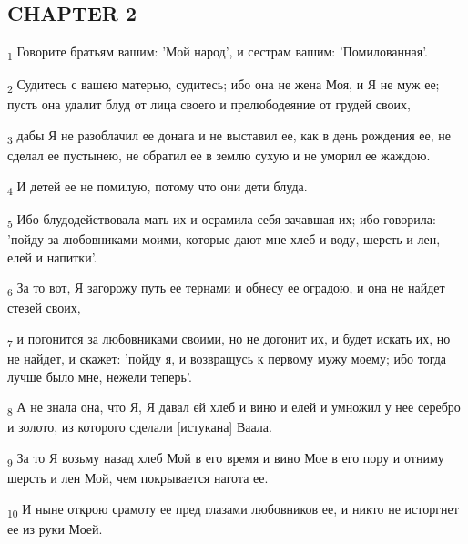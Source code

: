 \subsection{CHAPTER 2}
\begin{tcolorbox}
\textsubscript{1} Говорите братьям вашим: 'Мой народ', и сестрам вашим: 'Помилованная'.
\end{tcolorbox}
\begin{tcolorbox}
\textsubscript{2} Судитесь с вашею матерью, судитесь; ибо она не жена Моя, и Я не муж ее; пусть она удалит блуд от лица своего и прелюбодеяние от грудей своих,
\end{tcolorbox}
\begin{tcolorbox}
\textsubscript{3} дабы Я не разоблачил ее донага и не выставил ее, как в день рождения ее, не сделал ее пустынею, не обратил ее в землю сухую и не уморил ее жаждою.
\end{tcolorbox}
\begin{tcolorbox}
\textsubscript{4} И детей ее не помилую, потому что они дети блуда.
\end{tcolorbox}
\begin{tcolorbox}
\textsubscript{5} Ибо блудодействовала мать их и осрамила себя зачавшая их; ибо говорила: 'пойду за любовниками моими, которые дают мне хлеб и воду, шерсть и лен, елей и напитки'.
\end{tcolorbox}
\begin{tcolorbox}
\textsubscript{6} За то вот, Я загорожу путь ее тернами и обнесу ее оградою, и она не найдет стезей своих,
\end{tcolorbox}
\begin{tcolorbox}
\textsubscript{7} и погонится за любовниками своими, но не догонит их, и будет искать их, но не найдет, и скажет: 'пойду я, и возвращусь к первому мужу моему; ибо тогда лучше было мне, нежели теперь'.
\end{tcolorbox}
\begin{tcolorbox}
\textsubscript{8} А не знала она, что Я, Я давал ей хлеб и вино и елей и умножил у нее серебро и золото, из которого сделали [истукана] Ваала.
\end{tcolorbox}
\begin{tcolorbox}
\textsubscript{9} За то Я возьму назад хлеб Мой в его время и вино Мое в его пору и отниму шерсть и лен Мой, чем покрывается нагота ее.
\end{tcolorbox}
\begin{tcolorbox}
\textsubscript{10} И ныне открою срамоту ее пред глазами любовников ее, и никто не исторгнет ее из руки Моей.
\end{tcolorbox}
